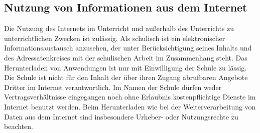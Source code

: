 \documentclass[a4paper, parskip]{scrartcl}
\begin{document}
\subsection{Nutzung von Informationen aus dem Internet}
Die Nutzung des Internets im Unterricht und außerhalb des Unterrichts zu
unterrichtlichen Zwecken ist zulässig. Als schulisch ist ein elektronischer
Informationsaustausch anzusehen, der unter Berücksichtigung seines Inhalts
und des Adressatenkreises mit der schulischen Arbeit im Zusammenhang steht.
Das Herunterladen von Anwendungen ist nur mit Einwilligung der Schule zu
lässig. Die Schule ist nicht für den Inhalt der über ihren Zugang abrufbaren
Angebote Dritter im Internet verantwortlich. Im Namen der Schule dürfen weder
Vertragsverhältnisse eingegangen noch ohne Erlaubnis kostenpflichtige Dienste
im Internet benutzt werden. Beim Herunterladen wie bei der Weiterverarbeitung
von Daten aus dem Internet sind insbesondere Urheber- oder Nutzungsrechte zu
beachten.
\end{document}
